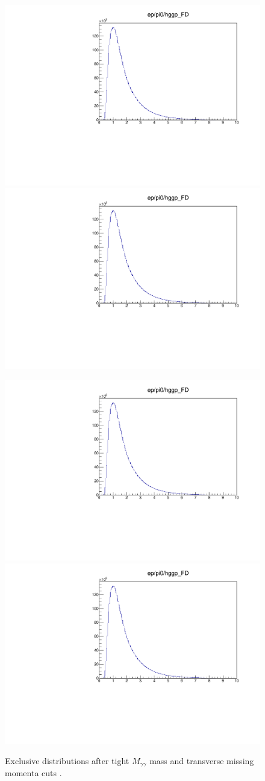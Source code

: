 \begin{figure}[hbt]
	\centering
	\includegraphics[page=43,width=0.45\linewidth]{Chapters/Ch4-BaseAnalysis/1_Exclusivity_Cuts/figures/eppi0.exclusive.pdf}
	\includegraphics[page=44,width=0.45\linewidth]{Chapters/Ch4-BaseAnalysis/1_Exclusivity_Cuts/figures/eppi0.exclusive.pdf}
	
	\includegraphics[page=45,width=0.45\linewidth]{Chapters/Ch4-BaseAnalysis/1_Exclusivity_Cuts/figures/eppi0.exclusive.pdf}
    \includegraphics[page=47,width=0.45\linewidth]{Chapters/Ch4-BaseAnalysis/1_Exclusivity_Cuts/figures/eppi0.exclusive.pdf}

	\caption{Exclusive distributions after tight $M_{\gamma\gamma}$ mass and transverse missing momenta cuts .}
	\label{fig:rawexclusive3}
\end{figure}

